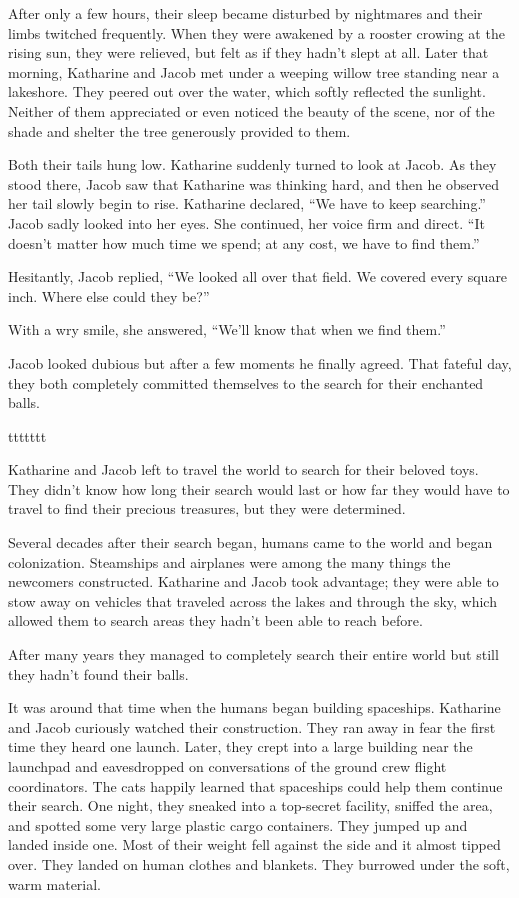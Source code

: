 After only a few hours, their sleep became disturbed by nightmares and their limbs twitched frequently. When they were awakened by a rooster crowing at the rising sun, they were relieved, but felt as if they hadn't slept at all. Later that morning, Katharine and Jacob met under a weeping willow tree standing near a lakeshore. They peered out over the water, which softly reflected the sunlight. Neither of them appreciated or even noticed the beauty of the scene, nor of the shade and shelter the tree generously provided to them.

Both their tails hung low. Katharine suddenly turned to look at Jacob. As they stood there, Jacob saw that Katharine was thinking hard, and then he observed her tail slowly begin to rise. Katharine declared, “We have to keep searching.” Jacob sadly looked into her eyes. She continued, her voice firm and direct. “It doesn't matter how much time we spend; at any cost, we have to find them.”

Hesitantly, Jacob replied, “We looked all over that field. We covered every square inch. Where else could they be?”

With a wry smile, she answered, “We'll know that when we find them.”

Jacob looked dubious but after a few moments he finally agreed. That fateful day, they both completely committed themselves to the search for their enchanted balls.



ttttttt



Katharine and Jacob left to travel the world to search for their beloved toys. They didn't know how long their search would last or how far they would have to travel to find their precious treasures, but they were determined.

Several decades after their search began, humans came to the world and began colonization. Steamships and airplanes were among the many things the newcomers constructed. Katharine and Jacob took advantage; they were able to stow away on vehicles that traveled across the lakes and through the sky, which allowed them to search areas they hadn't been able to reach before.

After many years they managed to completely search their entire world but still they hadn't found their balls.

It was around that time when the humans began building spaceships. Katharine and Jacob curiously watched their construction. They ran away in fear the first time they heard one launch. Later, they crept into a large building near the launchpad and eavesdropped on conversations of the ground crew flight coordinators. The cats happily learned that spaceships could help them continue their search. One night, they sneaked into a top-secret facility, sniffed the area, and spotted some very large plastic cargo containers. They jumped up and landed inside one. Most of their weight fell against the side and it almost tipped over. They landed on human clothes and blankets. They burrowed under the soft, warm material.

